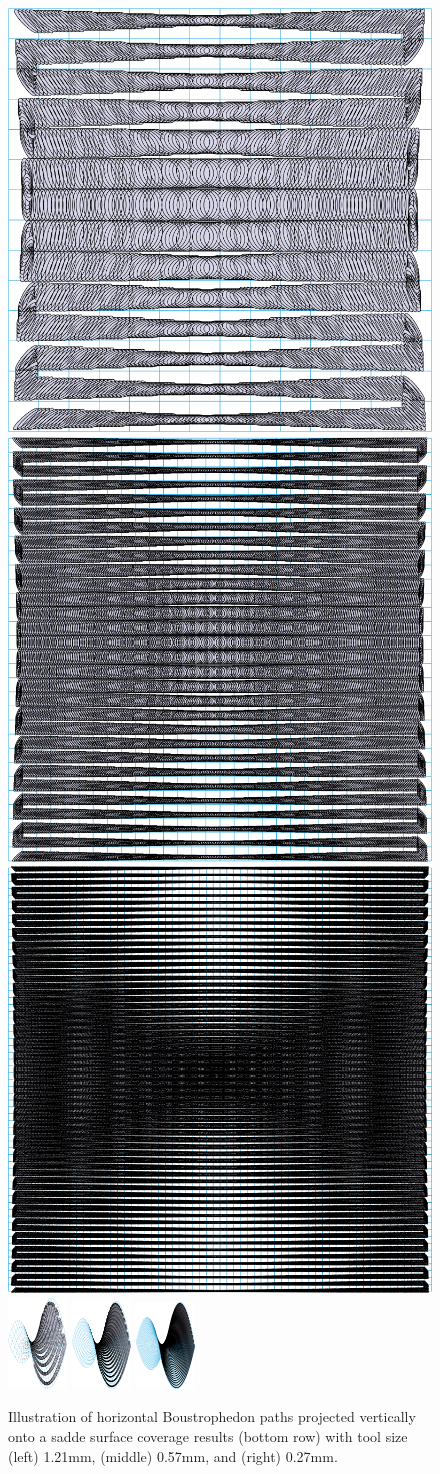 \documentclass[lettersize,journal]{IEEEtran}
\begin{document}
\begin{figure}[t]
\centering
\includegraphics[height=0.14\textwidth]{figures/new_saddle/boust/sparse_top}
\includegraphics[height=0.14\textwidth]{figures/new_saddle/boust/middle_top}
\includegraphics[height=0.14\textwidth]{figures/new_saddle/boust/dense_top}
\includegraphics[width=0.14\textwidth]{figures/new_saddle/boust/sparse}
\includegraphics[width=0.14\textwidth]{figures/new_saddle/boust/middle}
\includegraphics[width=0.14\textwidth]{figures/new_saddle/boust/dense}
\caption{
Illustration of horizontal Boustrophedon paths projected vertically onto a sadde surface coverage results (bottom row) with tool size (left) 1.21mm, (middle) 0.57mm, and (right) 0.27mm. 
}\label{fig:exp_boust_horizontal}
\end{figure}
\end{document}
